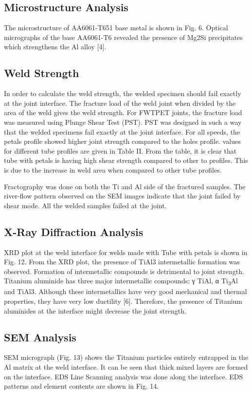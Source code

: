 \documentclass[3p]{elsarticle}
\begin{document}
\subsection{Microstructure Analysis}
\label{subsec:Microstructure Analysis}
The microstructure of AA6061-T651 base metal is shown in Fig. 6. Optical micrographs of the base AA6061-T6 revealed the presence of Mg2Si precipitates which strengthens the Al alloy [4].

\subsection{Weld Strength}
\label{subsec:Weld Strength}
In order to calculate the weld strength, the welded specimen should fail exactly at the joint interface. The fracture load of the weld joint when divided by the area of the weld gives the weld strength. For FWTPET joints, the fracture load was measured using Plunge Shear Test (PST). PST was designed in such a way that the welded specimens fail exactly at the joint interface. For all speeds, the petals profile showed higher joint strength compared to the holes profile.  values for different tube profiles are given in Table II. From the table, it is clear that tube with petals is having high shear strength compared to other to profiles. This is due to the increase in weld area when compared to other tube profiles.
\par
Fractography was done on both the Ti and Al side of the fractured samples. The river-flow pattern observed on the SEM images indicate that the joint failed by shear mode. All the welded samples failed at the joint.




\subsection{X-Ray Diffraction Analysis}
\label{subsec:XRD-Results}
XRD plot at the weld interface for welds made with Tube with petals is shown in Fig. 12. From the XRD plot, the
presence of TiAl3 intermetallic formation was observed. Formation of intermetallic compounds is detrimental to joint strength. Titanium aluminide has three major intermetallic compounds: γ TiAl, α Ti\textsubscript{3}Al and TiAl3. Although these intermetallics have very good mechanical and thermal properties, they have very low ductility [6]. Therefore, the presence of Titanium aluminides at the interface might decrease the joint strength.

\subsection{SEM Analysis}
\label{subsec:SEM Analysis}
SEM micrograph (Fig. 13) shows the Titanium particles entirely entrapped in the Al matrix at the weld interface. It can be seen that thick mixed layers are formed on the interface. EDS Line Scanning analysis was done along the interface. EDS patterns and element contents are shown in Fig. 14.
\end{document}
